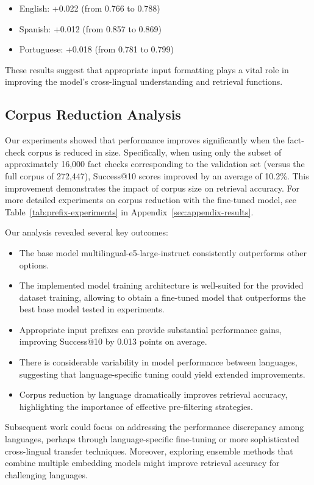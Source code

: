 \documentclass[11pt]{article}
\begin{document}
\begin{itemize}
    \item English: +0.022 (from 0.766 to 0.788)
    \item Spanish: +0.012 (from 0.857 to 0.869)
    \item Portuguese: +0.018 (from 0.781 to 0.799)
\end{itemize}

These results suggest that appropriate input formatting plays a vital role in improving the model's cross-lingual understanding and retrieval functions.

\subsection{Corpus Reduction Analysis}
Our experiments showed that performance improves significantly when the fact-check corpus is reduced in size. Specifically, when using only the subset of approximately 16,000 fact checks corresponding to the validation set (versus the full corpus of 272,447), Success@10 scores improved by an average of 10.2\%. This improvement demonstrates the impact of corpus size on retrieval accuracy. For more detailed experiments on corpus reduction with the fine-tuned model, see Table~\ref{tab:prefix-experiments} in Appendix~\ref{sec:appendix-results}.

Our analysis revealed several key outcomes:

\begin{itemize}
    \item The base model multilingual-e5-large-instruct consistently outperforms other options.
    \item The implemented model training architecture is well-suited for the provided dataset training, allowing to obtain a fine-tuned model that outperforms the best base model tested in experiments.
    \item Appropriate input prefixes can provide substantial performance gains, improving Success@10 by 0.013 points on average.
    \item There is considerable variability in model performance between languages, suggesting that language-specific tuning could yield extended improvements.
    \item Corpus reduction by language dramatically improves retrieval accuracy, highlighting the importance of effective pre-filtering strategies.
\end{itemize}

Subsequent work could focus on addressing the performance discrepancy among languages, perhaps through language-specific fine-tuning or more sophisticated cross-lingual transfer techniques. Moreover, exploring ensemble methods that combine multiple embedding models might improve retrieval accuracy for challenging languages.
\end{document}
